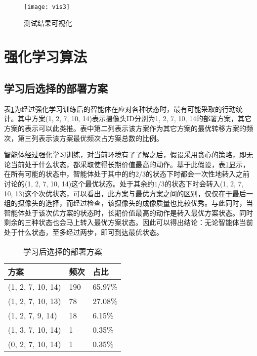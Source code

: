 \begin{figure}[!ht]
    \centering
    \texttt{[image: vis3]}
    \caption{测试结果可视化}
    \label{fig:testvis}
\end{figure}

\section{强化学习算法}

\subsection{学习后选择的部署方案}

表\ref{tab:rlresult}为经过强化学习训练后的智能体在应对各种状态时，最有可能采取的行动统计。其中方案(1, 2, 7, 10, 14)表示摄像头ID分别为1, 2, 7, 10, 14的部署方案，其它方案的表示可以此类推。表中第二列表示该方案作为其它方案的最优转移方案的频次，第三列表示该方案最优频次占方案总数的比例。

智能体经过强化学习训练，对当前环境有了了解之后，假设采用贪心的策略，即无论当前处于什么状态，都采取使得长期价值最高的动作。基于此假设，表\ref{tab:rlresult}显示，在所有可能的状态中，智能体处于其中的约$2/3$的状态下时都会一次性地转入之前讨论的(1, 2, 7, 10, 14)这个最优状态。处于其余约$1/3$的状态下时会转入(1, 2, 7, 10, 13)这个次优状态，可以看出，此方案与最优方案之间的区别，仅仅在于最后一组的摄像头的选择，而经过检查，该摄像头的成像质量也比较优秀。与此同时，当智能体处于该次优方案的状态时，长期价值最高的动作是转入最优方案状态。同时剩余的三种状态也会马上转入最优方案状态。因此可以得出结论：无论智能体当前处于什么状态，至多经过两步，即可到达最优状态。

\begin{table}[h!]
    \centering
    \caption{学习后选择的部署方案}
    \label{tab:rlresult}
    \begin{tabularx}{\textwidth}{XXX}
    \toprule
    方案               & 频次  & 占比      \\ \midrule
    (1, 2, 7, 10, 14) & 190 & 65.97\% \\
    (1, 2, 7, 10, 13) & 78  & 27.08\% \\
    (1, 2, 7, 9, 14)  & 18  & 6.15\%  \\
    (1, 3, 7, 10, 14) & 1   & 0.35\%  \\
    (0, 2, 7, 10, 14) & 1   & 0.35\%  \\ \bottomrule
    \end{tabularx}
\end{table}


